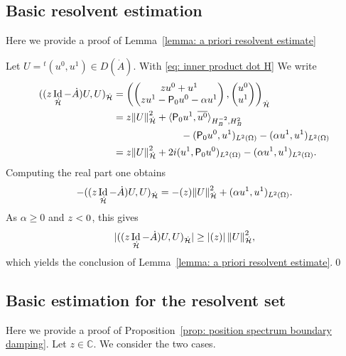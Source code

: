 \documentclass[JEP,XML,SOM,Unicode,published]{cedram}
\theoremstyle{plain}
\theoremstyle{definition}
\def\C{\mathbb{C}}
\let \Re \relax
\DeclareMathOperator{\Re}{Re}
\let \Im \relax
\DeclareMathOperator{\Im}{Im}
\newcommand{\ovl}[1]{\overline{#1}}
\newcommand{\inp}[2]{(#1, #2)}
\newcommand{\dup}[2]{\langle #1 , #2 \rangle}
\renewcommand{\H}{{\mathcal H}}
\newcommand{\transp}{\ensuremath{\phantom{}^{t}}}
\newcommand{\Norm}[2]{{\| #1 \|}_{#2}}
\newcommand{\Pell}{\mathsf P_0}
\DeclareMathOperator{\id}{Id}
\begin{document}
\subsection{Basic resolvent estimation}
\label{sec: lemma: a priori resolvent estimate}
Here we provide a proof of Lemma~\ref{lemma: a priori resolvent
estimate}

Let $U= \transp (u^0, u^1) \in D(\dot{A})$. With \eqref{eq: inner product dot H} We write
\begin{align*}
\inp{(z \id_{\dot{\H}} - \dot{A})U}{U}_{\dot{\H}}
&= \left(\begin{pmatrix}z u^0 + u^1\\zu^1 - \Pell u^0 - \alpha u^1 \end{pmatrix},
\begin{pmatrix} u^0 \\u^1\end{pmatrix}
\right)_{\dot{\H}}\\
&= z \Norm{U}{\dot{\H}}^2
+ \dup{\Pell u^1}{\ovl{u^0}}_{H^{-2}_B,H^2_B} \\
&\hspace*{2.4cm} - \inp{\Pell u^0}{u^1}_{L^2(\Omega)}
- \inp{\alpha u^1}{u^1}_{L^2 (\Omega)}
\\
&= z \Norm{U}{\dot{\H}}^2
+ 2 i \Im \inp{u^1}{\Pell u^0}_{L^2 (\Omega)}
- \inp{\alpha u^1}{u^1}_{L^2 (\Omega)}.
\end{align*}
Computing the real part one obtains
\begin{equation}
\label{eq: scalar product sigma id -A boundary damping}
- \Re \inp{(z \id_{\dot{\H}}- \dot{A})U}{U}_{\dot{\H}}
= - \Re (z) \Norm{U}{\dot{\H}}^2
+ \inp{\alpha u^1}{u^1}_{L^2 (\Omega)}.
\end{equation}
As $\alpha \geq 0$ and $\Re z<0$, this gives
\begin{equation*}
|\Re \inp{(z \id_{\dot{\H}} - \dot{A})U}{U}_{\dot{\H}} |
\geq |\Re (z) |\, \Norm{U}{\dot{\H}}^2 ,
\end{equation*}
which yields the conclusion of Lemma~\ref{lemma: a priori resolvent estimate}.\qed

\subsection{Basic estimation for the resolvent set}
\label{sec: prop: position spectrum boundary damping}

Here we provide a proof of Proposition~\ref{prop: position spectrum
boundary damping}.
Let $z \in \C$. We consider the two cases.
\end{document}
